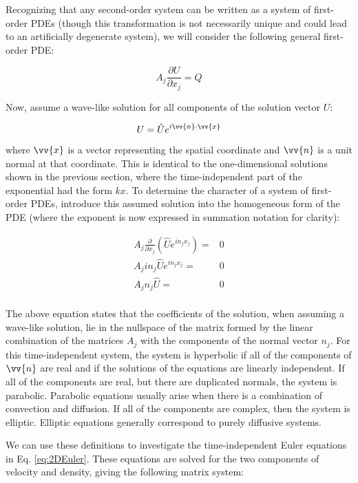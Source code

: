 \documentclass[10pt]{article}
\newcommand{\beq}{\begin{equation}}
\newcommand{\eeq}{\end{equation}}
\newcommand{\beqa}{\begin{equation}\begin{aligned}}
\newcommand{\eeqa}{\end{aligned}\end{equation}}
\begin{document}
\begin{flushleft}
Recognizing that any second-order system can be written as a system of first-order PDEs (though this transformation is not necessarily unique and could lead to an artificially degenerate system), we will consider the following general first-order PDE:

\beq
A_j\frac{\partial U}{\partial x_j}=Q
\eeq

Now, assume a wave-like solution for all components of the solution vector \(U\):

\beq
U=\hat{U}e^{i\vv{n}\cdot\vv{x}}
\eeq

where \(\vv{x}\) is a vector representing the spatial coordinate and \(\vv{n}\) is a unit normal at that coordinate. This is identical to the one-dimensional solutions shown in the previous section, where the time-independent part of the exponential had the form \(kx\). To determine the character of a system of first-order PDEs, introduce this assumed solution into the homogeneous form of the PDE (where the exponent is now expressed in summation notation for clarity):

\beqa
\label{eq:Condition}
A_j\frac{\partial}{\partial x_j}\left(\hat{U}e^{in_jx_j}\right)=&0\\
A_jin_j\hat{U}e^{in_jx_j}=&0\\
A_jn_j\hat{U}=&0\\
\eeqa

The above equation states that the coefficients of the solution, when assuming a wave-like solution, lie in the nullspace of the matrix formed by the linear combination of the matrices \(A_j\) with the components of the normal vector \(n_j\). For this time-independent system, the system is hyperbolic if all of the components of \(\vv{n}\) are real and if the solutions of the equations are linearly independent. If all of the components are real, but there are duplicated normals, the system is parabolic. Parabolic equations usually arise when there is a combination of convection and diffusion. If all of the components are complex, then the system is elliptic. Elliptic equations generally correspond to purely diffusive systems.

We can use these definitions to investigate the time-independent Euler equations in Eq. \eqref{eq:2DEuler}. These equations are solved for the two components of velocity and density, giving the following matrix system:


\end{flushleft}
\end{document}
